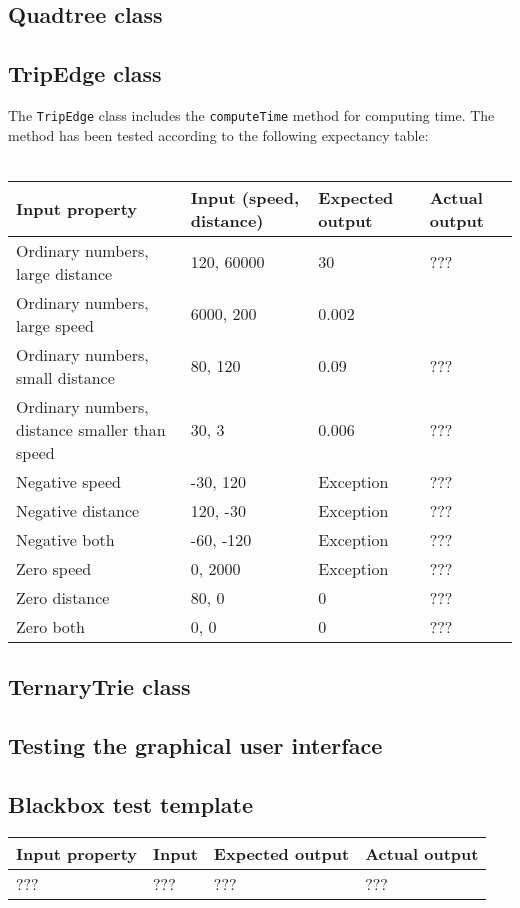 \documentclass[a4paper,11pt]{article}
\begin{document}
\subsection{Quadtree class}

\pagebreak
\subsection{TripEdge class}
The \texttt{TripEdge} class includes the \texttt{computeTime} method for computing time. The method has been tested according to the following expectancy table: \\ \\
\begin{tabular}{ p{3.5cm} | p{2.5cm} | p{2.5cm} | p{2.5cm} }
	Input property & Input (speed, distance) & Expected output & Actual output \\
	\hline
	Ordinary numbers, large distance & 120, 60000 & 30 & ??? \\
	Ordinary numbers, large speed & 6000, 200 & 0.002 \\
	Ordinary numbers, small distance & 80, 120 & 0.09 & ??? \\
	Ordinary numbers, distance smaller than speed & 30, 3 & 0.006 & ??? \\
	Negative speed & -30, 120 & Exception & ??? \\
	Negative distance & 120, -30 & Exception & ??? \\
	Negative both & -60, -120 & Exception & ??? \\
	Zero speed & 0, 2000 & Exception & ??? \\
	Zero distance & 80, 0 & 0 & ??? \\
	Zero both & 0, 0 & 0 & ???
\end{tabular}

\pagebreak
\subsection{TernaryTrie class}

\pagebreak
\subsection{Testing the graphical user interface}

\pagebreak
\subsection{Blackbox test template}
\begin{tabular}{ p{3.5cm} | p{2.5cm} | p{2.5cm} | p{2.5cm} }
	Input property & Input & Expected output & Actual output \\
	\hline
	??? & ??? & ??? & ???
\end{tabular}
\end{document}
